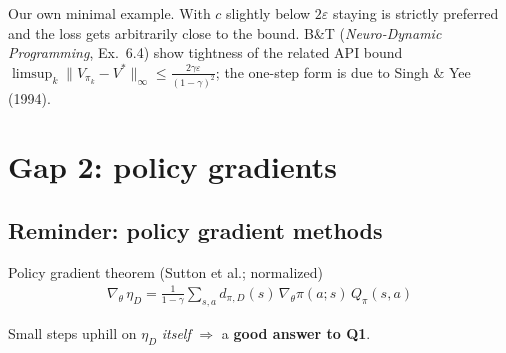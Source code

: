 \begin{notebox}
Our own minimal example. With $c$ slightly below $2\varepsilon$ staying is strictly preferred and the loss gets arbitrarily close to the bound. B\&T (\emph{Neuro-Dynamic Programming}, Ex.~6.4) show tightness of the related API bound $\limsup_k\|V_{\pi_k}-V^*\|_\infty\le\frac{2\gamma\varepsilon}{(1-\gamma)^2}$; the one-step form is due to Singh \& Yee (1994).
\end{notebox}

\section{Gap 2: policy gradients}

\subsection{Reminder: policy gradient methods}

\begin{center}
\end{center}

\begin{thmbox}{Policy gradient theorem (Sutton et al.; normalized)}
\begin{gather*}
  \nabla_\theta\, \eta_D = \frac{1}{1-\gamma}\sum_{s,a} d_{\pi,D}(s)\, \nabla_\theta \pi(a;s)\, Q_\pi(s,a)
\end{gather*}
\end{thmbox}

Small steps uphill on $\eta_D$ \emph{itself} $\Rightarrow$ a \textbf{good answer to Q1}.

